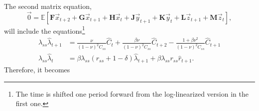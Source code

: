 \documentclass[11pt]{article}
\numberwithin{equation}{section} %
\numberwithin{figure}{section} %
\numberwithin{table}{section} %
\theoremstyle{definition}
\begin{document}
The second matrix equation,
\[
    \vec 0 = \mathbb{E} \left[ \mathbf{F} \vec{x}_{t+2} + \mathbf{G} \vec{x}_{t+1} + \mathbf{H} \vec{x}_t + \mathbf{J} \vec{y}_{t+1} + \mathbf{K} \vec{y}_t + \mathbf{L} \vec{z}_{t+1} + \mathbf{M} \vec{z}_t \right],
\]
will include the equations\footnote{The time is shifted one period forward from the log-linearized version in the first one.}
\begin{align*}
    \lambda_{ss} \hat{\lambda}_{t+1} &= \frac{\nu}{(1 - \nu)^2 C_{ss}} \hat{C}_t + \frac{\beta \nu}{(1 - \nu)^2 C_{ss}} \hat{C}_{t+2} - \frac{1 + \beta \nu^2}{(1 - \nu)^2 C_{ss}} \hat{C}_{t+1} \\
    \lambda_{ss} \hat{\lambda}_t &= \beta \lambda_{ss} (r_{ss} + 1 - \delta) \hat{\lambda}_{t+1} + \beta \lambda_{ss} r_{ss} \hat{r}_{t+1}.
\end{align*}
Therefore, it becomes
\end{document}
